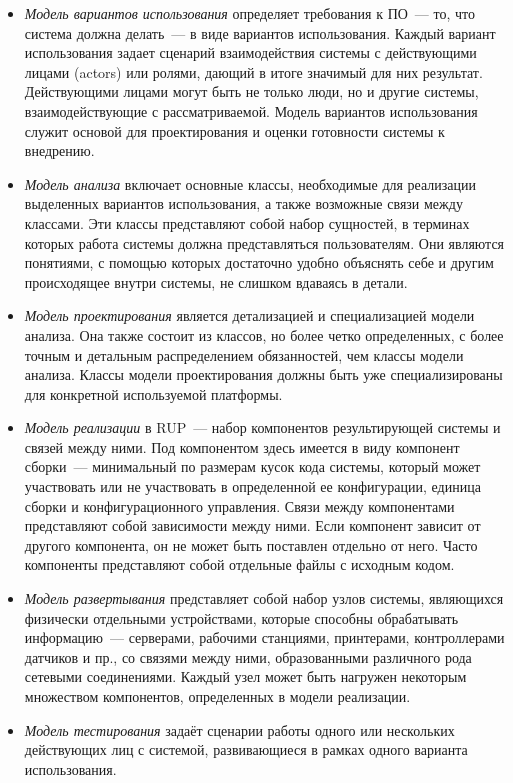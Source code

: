 \documentclass{../../text-style}
\begin{document}
\begin{itemize}
    \item \emph{Модель вариантов использования} определяет требования к ПО~--- то, что система должна делать~--- в виде вариантов использования. Каждый вариант использования задает сценарий взаимодействия системы с действующими лицами (actors) или ролями, дающий в итоге значимый для них результат. Действующими лицами могут быть не только люди, но и другие системы, взаимодействующие с рассматриваемой. Модель вариантов использования служит основой для проектирования и оценки готовности системы к внедрению.
    \item \emph{Модель анализа} включает основные классы, необходимые для реализации выделенных вариантов использования, а также возможные связи между классами. Эти классы представляют собой набор сущностей, в терминах которых работа системы должна представляться пользователям. Они являются понятиями, с помощью которых достаточно удобно объяснять себе и другим происходящее внутри системы, не слишком вдаваясь в детали.
    \item \emph{Модель проектирования} является детализацией и специализацией модели анализа. Она также состоит из классов, но более четко определенных, с более точным и детальным распределением обязанностей, чем классы модели анализа. Классы модели проектирования должны быть уже специализированы для конкретной используемой платформы.
    \item \emph{Модель реализации} в RUP~--- набор компонентов результирующей системы и связей между ними. Под компонентом здесь имеется в виду компонент сборки~--- минимальный по размерам кусок кода системы, который может участвовать или не участвовать в определенной ее конфигурации, единица сборки и конфигурационного управления. Связи между компонентами представляют собой зависимости между ними. Если компонент зависит от другого компонента, он не может быть поставлен отдельно от него. Часто компоненты представляют собой отдельные файлы с исходным кодом.
    \item \emph{Модель развертывания} представляет собой набор узлов системы, являющихся физически отдельными устройствами, которые способны обрабатывать информацию~--- серверами, рабочими станциями, принтерами, контроллерами датчиков и пр., со связями между ними, образованными различного рода сетевыми соединениями. Каждый узел может быть нагружен некоторым множеством компонентов, определенных в модели реализации. 
    \item \emph{Модель тестирования} задаёт сценарии работы одного или нескольких действующих лиц с системой, развивающиеся в рамках одного варианта использования.
\end{itemize}
\end{document}
